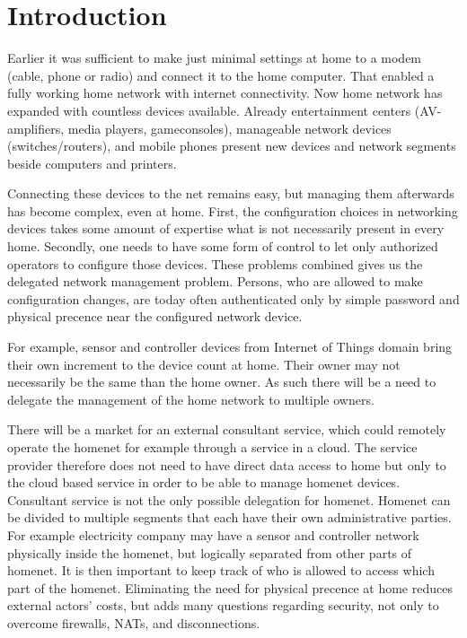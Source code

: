 \documentclass[12pt,a4paper,english]{tutthesis}
\begin{document}
\chapter{Introduction}
\label{sec-1}
\label{cha:intro}



Earlier it was sufficient to make just minimal settings at home to
a modem (cable, phone or radio) and connect it to
the home computer. That enabled a fully working home network
with internet connectivity.  Now home network has expanded with countless
devices available.
Already entertainment centers (AV-amplifiers, media players, gameconsoles),
manageable network devices (switches/routers), and mobile phones
present new devices and network segments beside computers and printers.

Connecting these devices to the net remains easy, but managing them afterwards
has become complex, even at home.
First, the configuration choices in networking devices takes some
amount of expertise what is not necessarily present in every
home. Secondly, one needs to have some form of control to let only
authorized operators to configure those devices. 
These problems combined gives us the delegated network
management problem.
Persons, who are allowed to make configuration changes, are today often
authenticated only by simple password and physical precence
near the configured network device.

For example, sensor and controller devices from Internet of Things
domain bring their own increment to the device count at home. Their
owner may not necessarily be the same than the home owner. As such
there will be a need to delegate the management of the home network to multiple owners. 




There will be a market for an external consultant service, which could
remotely operate the homenet for example through a service in a cloud. 
The service provider therefore does not need to have direct data
access to home but only to the cloud based service in order to be able to
manage homenet devices.
Consultant service is not the only possible delegation for homenet.
Homenet can be divided to multiple segments that each have
their own administrative parties. For example electricity company may
have a sensor and controller network physically inside the homenet, but
logically separated from other parts of homenet. It is then
important to keep track of who is allowed to access which part of the homenet.
Eliminating the need for 
physical precence at home reduces external actors' costs, but adds many questions
regarding security, not only to overcome firewalls, NATs, and disconnections.
\end{document}
